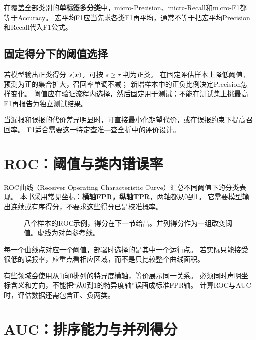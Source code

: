 在覆盖全部类别的\textbf{单标签多分类}中，micro-Precision、micro-Recall和micro-F1都等于Accuracy。
宏平均F1应当先求各类F1再平均，通常不等于把宏平均Precision和Recall代入F1公式。

\subsection{固定得分下的阈值选择}
若模型输出正类得分 $s(\boldsymbol{x})$，可按 $s\geq\tau$ 判为正类。
在固定评估样本上降低阈值，预测为正的集合扩大，召回率单调不减；
新增样本中的正负比例决定Precision怎样变化。
阈值应在验证流程内选择，然后固定用于测试；不能在测试集上挑最高F1再报告为独立测试结果。

当漏报和误报的代价差异明显时，可直接最小化期望代价，或在误报约束下提高召回率。
F1适合需要这一特定查准—查全折中的评价设计。



\section{ROC：阈值与类内错误率}
\label{sec:eval-roc}

ROC曲线（Receiver Operating Characteristic Curve）汇总不同阈值下的分类表现。
本书采用常见坐标：\textbf{横轴FPR，纵轴TPR}，两轴都从0到1。
它需要模型输出连续或有序得分，不要求这些得分已是校准概率。

\begin{figure}[htbp]
\centering
\caption{八个样本的ROC示例，得分在下一节给出。并列得分作为一组改变阈值。虚线为对角参考线。}
\label{fig:eval-roc}
\par\smallskip
{}
\end{figure}

每一个曲线点对应一个阈值，部署时选择的是其中一个运行点。
若实际只能接受很低的误报率，应重点看相应区域，而不是只比较整个曲线面积。

\begin{pitfall}[核对ROC的坐标方向]
有些领域会使用从1向0排列的特异度横轴，等价展示同一关系。
必须同时声明坐标含义和方向，不能把“从0到1的特异度轴”误画成标准FPR轴。
计算ROC与AUC时，评估数据还需包含正、负两类。
\end{pitfall}

\section{AUC：排序能力与并列得分}
\label{sec:eval-auc}

